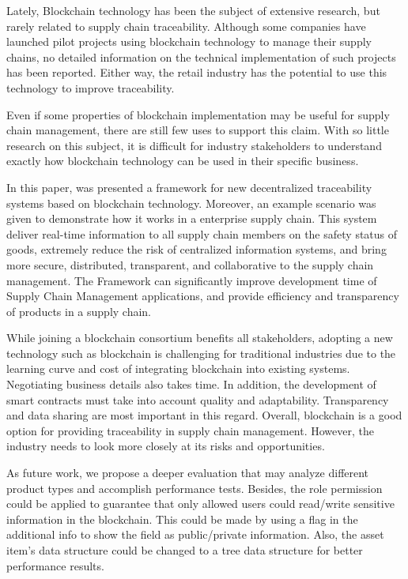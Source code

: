 \acresetall 
\label{chap:conclusion}

Lately, Blockchain technology has been the subject of extensive research, but rarely related to supply chain traceability. Although some companies have launched pilot projects using blockchain technology to manage their supply chains, no detailed information on the technical implementation of such projects has been reported. Either way, the retail industry has the potential to use this technology to improve traceability.

Even if some properties of blockchain implementation may be useful for supply chain management, there are still few uses to support this claim. With so little research on this subject, it is difficult for industry stakeholders to understand exactly how blockchain technology can be used in their specific business.

In this paper, was presented a framework for new decentralized traceability systems based on blockchain technology. Moreover, an example scenario was given to demonstrate how it works in a enterprise supply chain. This system deliver real-time information to all supply chain members on the safety status of goods, extremely reduce the risk of centralized information systems, and bring more secure, distributed, transparent, and collaborative to the supply chain management. The Framework can significantly improve development time of Supply Chain Management applications, and provide efficiency and transparency of products in a supply chain.

While joining a blockchain consortium benefits all stakeholders, adopting a new technology such as blockchain is challenging for traditional industries due to the learning curve and cost of integrating blockchain into existing systems. Negotiating business details also takes time. In addition, the development of smart contracts must take into account quality and adaptability. Transparency and data sharing are most important in this regard. Overall, blockchain is a good option for providing traceability in supply chain management. However, the industry needs to look more closely at its risks and opportunities.

As future work, we propose a deeper evaluation that may analyze different product types and accomplish performance tests. Besides, the role permission could be applied to guarantee that only allowed users could read/write sensitive information in the blockchain. This could be made by using a flag in the additional info to show the field as public/private information. Also, the asset item's data structure could be changed to a tree data structure for better performance results. 